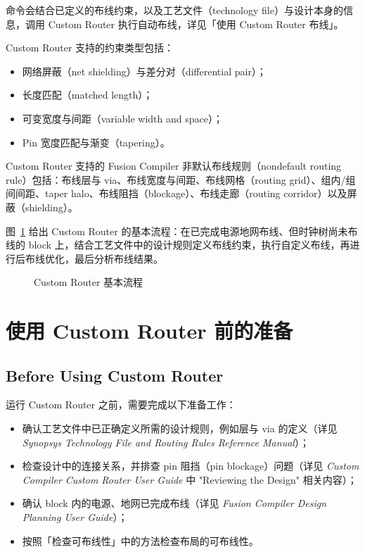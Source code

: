  命令会结合已定义的布线约束，以及工艺文件（technology file）与设计本身的信息，调用 Custom Router 执行自动布线，详见「使用 Custom Router 布线」。

Custom Router 支持的约束类型包括：
\begin{itemize}
  \item 网络屏蔽（net shielding）与差分对（differential pair）；
  \item 长度匹配（matched length）；
  \item 可变宽度与间距（variable width and space）；
  \item Pin 宽度匹配与渐变（tapering）。
\end{itemize}

Custom Router 支持的 Fusion Compiler 非默认布线规则（nondefault routing rule）包括：布线层与 via、布线宽度与间距、布线网格（routing grid）、组内/组间间距、taper halo、布线阻挡（blockage）、布线走廊（routing corridor）以及屏蔽（shielding）。

图~\ref{fig:custom-router-flow} 给出 Custom Router 的基本流程：在已完成电源地网布线、但时钟树尚未布线的 block 上，结合工艺文件中的设计规则定义布线约束，执行自定义布线，再进行后布线优化，最后分析布线结果。

\begin{figure}[htbp]
\centering
{}
\caption{Custom Router 基本流程}
\label{fig:custom-router-flow}
\end{figure}

\section{使用 Custom Router 前的准备}
\subsection*{Before Using Custom Router}

运行 Custom Router 之前，需要完成以下准备工作：
\begin{itemize}
  \item 确认工艺文件中已正确定义所需的设计规则，例如层与 via 的定义（详见 \textit{Synopsys Technology File and Routing Rules Reference Manual}）；
  \item 检查设计中的连接关系，并排查 pin 阻挡（pin blockage）问题（详见 \textit{Custom Compiler Custom Router User Guide} 中 "Reviewing the Design" 相关内容）；
  \item 确认 block 内的电源、地网已完成布线（详见 \textit{Fusion Compiler Design Planning User Guide}）；
  \item 按照「检查可布线性」中的方法检查布局的可布线性。
\end{itemize}

